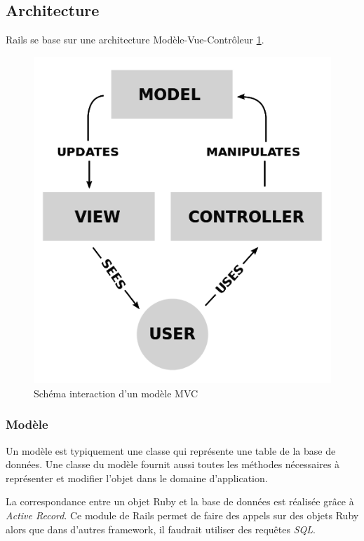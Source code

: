 \subsection{Architecture}
Rails se base sur une architecture Modèle-Vue-Contrôleur \ref{fig:mvc}.
\begin{figure}[ht]
  \begin{center}
    \includegraphics[scale=0.3]{content/4-prerequis/images/mvc}
    \caption{Schéma interaction d'un modèle MVC}
    \label{fig:mvc}
  \end{center}
\end{figure}
\subsubsection{Modèle} 
Un modèle est typiquement une classe qui représente une table de la base de données. Une classe du modèle fournit aussi toutes les méthodes nécessaires à représenter et modifier l'objet dans le domaine d'application.

La correspondance entre un objet Ruby et la base de données est réalisée grâce à \textit{Active Record}. Ce module de Rails permet de faire des appels sur des objets Ruby alors que dans d'autres framework, il faudrait utiliser des requêtes \textit{SQL}. \label{active-record}
  
